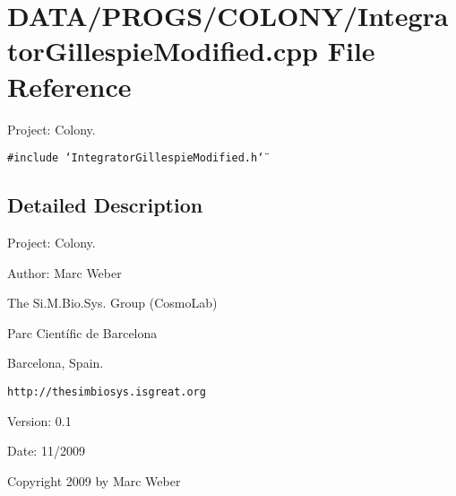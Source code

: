 \section{DATA/PROGS/COLONY/IntegratorGillespieModified.cpp File Reference}
\label{IntegratorGillespieModified_8cpp}
Project: Colony. 

{\tt \#include \char`\"{}IntegratorGillespieModified.h\char`\"{}}\par


\subsection{Detailed Description}
Project: Colony. 

\begin{Desc}
\item[Author:]Marc Weber\par
 The Si.M.Bio.Sys. Group (CosmoLab)\par
 Parc Científic de Barcelona\par
 Barcelona, Spain.\par
 {\tt http://thesimbiosys.isgreat.org} \end{Desc}
\begin{Desc}
\item[Version:]0.1 \end{Desc}
\begin{Desc}
\item[Date:]11/2009\end{Desc}
Copyright 2009 by Marc Weber 